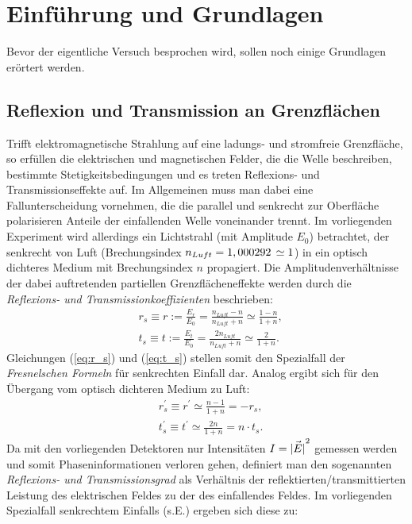\section{Einführung und Grundlagen}
	
	Bevor der eigentliche Versuch besprochen wird, sollen noch einige Grundlagen erörtert werden.
\subsection{Reflexion und Transmission an Grenzflächen} \label{sec:fresnel}
	Trifft elektromagnetische Strahlung auf eine ladungs- und stromfreie Grenzfläche, so erfüllen die elektrischen und magnetischen Felder, die die Welle beschreiben, bestimmte Stetigkeitsbedingungen und es treten Reflexions- und Transmissionseffekte auf. Im Allgemeinen muss man dabei eine Fallunterscheidung vornehmen, die die parallel und senkrecht zur Oberfläche polarisieren Anteile der einfallenden Welle voneinander trennt. Im vorliegenden Experiment wird allerdings ein Lichtstrahl (mit Amplitude $E_0$) betrachtet, der senkrecht von Luft (Brechungsindex $n_{Luft} = \unit[1,000292]{} \simeq 1$) in ein optisch dichteres Medium mit Brechungsindex $n$ propagiert. Die Amplitudenverhältnisse der dabei auftretenden partiellen Grenzflächeneffekte werden durch die \textit{Reflexions- und Transmissionkoeffizienten} beschrieben:
	\begin{align}
		&r_s \equiv r := \frac{E_r}{E_0} = \frac{n_{Luft} - n}{n_{Luft} + n} \simeq \frac{1 - n}{1 + n}, \label{eq:r_s}\\
		&t_s \equiv t := \frac{E_t}{E_0} = \frac{2n_{Luft}}{n_{Luft} + n} \simeq \frac{2}{1 + n}. \label{eq:t_s} 
	\end{align}
	Gleichungen (\ref{eq:r_s}) und (\ref{eq:t_s}) stellen somit den Spezialfall der \textit{Fresnelschen Formeln} für senkrechten Einfall dar. Analog ergibt sich für den Übergang vom optisch dichteren Medium zu Luft:
	\begin{align}
			&r_s^\prime \equiv r^\prime \simeq \frac{n - 1}{1 + n} = -r_s,\\
			&t_s^\prime \equiv t^\prime \simeq \frac{2n}{1 + n} = n \cdot t_s. 
	\end{align}
	Da mit den vorliegenden Detektoren nur Intensitäten $I = \vec{\left\vert E\right\vert}^2$ gemessen werden und somit Phaseninformationen verloren gehen, definiert man den sogenannten \textit{Reflexions- und Transmissionsgrad} als Verhältnis der reflektierten/transmittierten Leistung des elektrischen Feldes zu der des einfallendes Feldes. Im vorliegenden Spe\-zial\-fall senkrechtem Einfalls (s.E.) ergeben sich diese zu:
